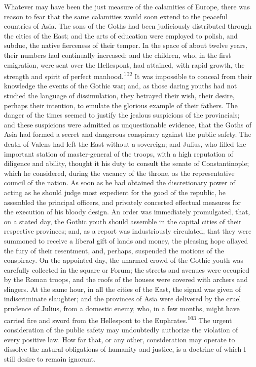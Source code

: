 Whatever may have been the just measure of the calamities of
Europe, there was reason to fear that the same calamities would
soon extend to the peaceful countries of Asia. The sons of the
Goths had been judiciously distributed through the cities of the
East; and the arts of education were employed to polish, and
subdue, the native fierceness of their temper. In the space of
about twelve years, their numbers had continually increased; and
the children, who, in the first emigration, were sent over the
Hellespont, had attained, with rapid growth, the strength and
spirit of perfect manhood.\textsuperscript{102} It was impossible to conceal from
their knowledge the events of the Gothic war; and, as those
daring youths had not studied the language of dissimulation, they
betrayed their wish, their desire, perhaps their intention, to
emulate the glorious example of their fathers. The danger of the
times seemed to justify the jealous suspicions of the
provincials; and these suspicions were admitted as unquestionable
evidence, that the Goths of Asia had formed a secret and
dangerous conspiracy against the public safety. The death of
Valens had left the East without a sovereign; and Julius, who
filled the important station of master-general of the troops,
with a high reputation of diligence and ability, thought it his
duty to consult the senate of Constantinople; which he
considered, during the vacancy of the throne, as the
representative council of the nation. As soon as he had obtained
the discretionary power of acting as he should judge most
expedient for the good of the republic, he assembled the
principal officers, and privately concerted effectual measures
for the execution of his bloody design. An order was immediately
promulgated, that, on a stated day, the Gothic youth should
assemble in the capital cities of their respective provinces;
and, as a report was industriously circulated, that they were
summoned to receive a liberal gift of lands and money, the
pleasing hope allayed the fury of their resentment, and, perhaps,
suspended the motions of the conspiracy. On the appointed day,
the unarmed crowd of the Gothic youth was carefully collected in
the square or Forum; the streets and avenues were occupied by the
Roman troops, and the roofs of the houses were covered with
archers and slingers. At the same hour, in all the cities of the
East, the signal was given of indiscriminate slaughter; and the
provinces of Asia were delivered by the cruel prudence of Julius,
from a domestic enemy, who, in a few months, might have carried
fire and sword from the Hellespont to the Euphrates.\textsuperscript{103} The
urgent consideration of the public safety may undoubtedly
authorize the violation of every positive law. How far that, or
any other, consideration may operate to dissolve the natural
obligations of humanity and justice, is a doctrine of which I
still desire to remain ignorant.

